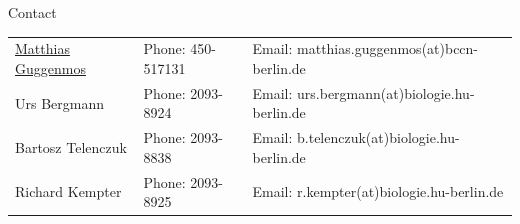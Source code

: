 \documentclass[12pt]{article}
\begin{document}
\vfill
\centerline{\CAP Contact}
\CAP

\begin{tabular}{lll}
\underline{Matthias Guggenmos} & Phone: 450-517131 & Email: matthias.guggenmos(at)bccn-berlin.de \\
Urs Bergmann & Phone: 2093-8924 & Email: urs.bergmann(at)biologie.hu-berlin.de \\
Bartosz Telenczuk & Phone: 2093-8838 & Email: b.telenczuk(at)biologie.hu-berlin.de \\
Richard Kempter & Phone: 2093-8925 & Email: r.kempter(at)biologie.hu-berlin.de \\
\end{tabular}
\end{document}

